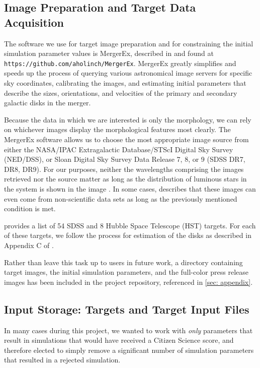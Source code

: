 \subsection{Image Preparation and Target Data Acquisition}
The software we use for target image preparation and for constraining the
initial simulation parameter values is MergerEx, described in
\citet{holincheckThesis} and found at
\texttt{https://github.com/aholinch/MergerEx}. MergerEx greatly simplifies and
speeds up the process of querying various astronomical image servers for
specific sky coordinates, calibrating the images, and estimating initial
parameters that describe the sizes, orientations, and velocities of the
primary and secondary galactic disks in the merger.

Because the data in which we are interested is only the morphology, we can rely
on whichever images display the morphological features most clearly.
The MergerEx software allows us to choose the most appropriate image source from
either the NASA/IPAC Extragalactic Database/STScI Digital Sky Survey (NED/DSS),
or Sloan Digital Sky Survey Data Release 7, 8, or 9 (SDSS DR7, DR8, DR9).
For our purposes, neither the wavelengths comprising the images retrieved nor
the source matter as long as the distribution of luminous stars in the system is
shown in the image \cite{Holincheck2015}. In some cases, \citet{Holincheck2015}
describes that these images can even come from non-scientific data sets as long
as the previously mentioned condition is met.

\citet{Holincheck2015} provides a list of 54 SDSS and 8 Hubble Space Telescope
(HST) targets. For each of these targets, we follow the process for estimation
of the disks as described in Appendix C of \citet{holincheckThesis}.

Rather than leave this task up to users in future work,
a directory containing target images, the initial simulation parameters,
and the full-color press release images has been included in the project
repository, referenced in \ref{sec: appendix}.

\subsection{Input Storage: Targets and Target Input Files}
In many cases during this project, we wanted to work with \textit{only}
parameters that result in simulations that would have received a
Citizen Science score, and therefore elected to simply remove a significant
number of simulation parameters that resulted in a rejected simulation.

